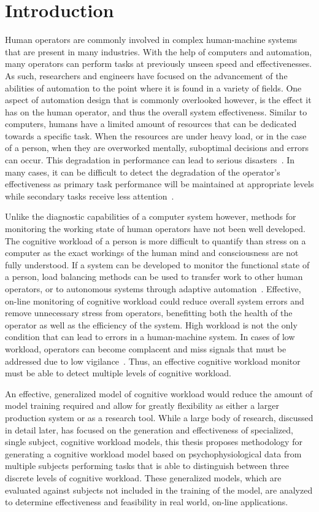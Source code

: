 \documentclass[11pt]{article}
\begin{document}
\section{Introduction}
Human operators are commonly involved in complex human-machine systems that are present in many industries. With the help of computers and automation, many operators can perform tasks at previously unseen speed and effectivenesses. As such, researchers and engineers have focused on the advancement of the abilities of automation to the point where it is found in a variety of fields. One aspect of automation design that is commonly overlooked however, is the effect it has on the human operator, and thus the overall system effectiveness. Similar to computers, humans have a limited amount of resources that can be dedicated towards a specific task. When the resources are under heavy load, or in the case of a person, when they are overworked mentally, suboptimal decisions and errors can occur. This degradation in performance can lead to serious disasters~\cite{Wickens}. In many cases, it can be difficult to detect the degradation of the operator's effectiveness as primary task performance will be maintained at appropriate levels while secondary tasks receive less attention~\cite{Hockey}. 

Unlike the diagnostic capabilities of a computer system however, methods for monitoring the working state of human operators have not been well developed. The cognitive workload of a person is more difficult to quantify than stress on a computer as the exact workings of the human mind and consciousness are not fully understood. If a system can be developed to monitor the functional state of a person, load balancing methods can be used to transfer work to other human operators, or to autonomous systems through adaptive automation~\cite{Wilson}. Effective, on-line monitoring of cognitive workload could reduce overall system errors and remove unnecessary stress from operators, benefitting both the health of the operator as well as the efficiency of the system. High workload is not the only condition that can lead to errors in a human-machine system. In cases of low workload, operators can become complacent and miss signals that must be addressed due to low vigilance~\cite{Byrne}. Thus, an effective cognitive workload monitor must be able to detect multiple levels of cognitive workload.

An effective, generalized model of cognitive workload would reduce the amount of model training required and allow for greatly flexibility as either a larger production system or as a research tool. While a large body of research, discussed in detail later, has focused on the generation and effectiveness of specialized, single subject, cognitive workload models, this thesis proposes methodology for generating a cognitive workload model based on psychophysiological data from multiple subjects performing tasks that is able to distinguish between three discrete levels of cognitive workload. These generalized models, which are evaluated against subjects not included in the training of the model, are analyzed to determine effectiveness and feasibility in real world, on-line applications. 
\end{document}
